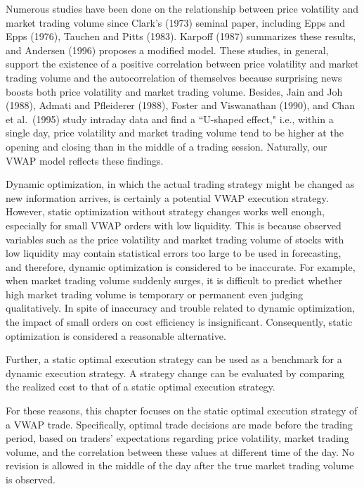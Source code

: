 Numerous studies have been done on the relationship between price volatility and market trading volume since Clark's (1973) seminal paper, including Epps and Epps (1976), Tauchen and Pitts (1983).  Karpoff (1987) summarizes these results, and Andersen (1996) proposes a modified model.  These studies, in general, support the existence of a positive correlation between price volatility and market trading volume and the autocorrelation of themselves because surprising news boosts both price volatility and market trading volume.  Besides, Jain and Joh (1988), Admati and Pfleiderer (1988), Foster and Viswanathan (1990), and Chan et al.~(1995) study intraday data and find a ``U-shaped effect," i.e., within a single day, price volatility and market trading volume tend to be higher at the opening and closing than in the middle of a trading session.  Naturally, our VWAP model reflects these findings.

Dynamic optimization, in which the actual trading strategy might be changed as new information arrives, is certainly a potential VWAP execution strategy.  However, static optimization without strategy changes works well enough, especially for small VWAP orders with low liquidity.  This is because observed variables such as the price volatility and market trading volume of stocks with low liquidity may contain statistical errors too large to be used in forecasting, and therefore, dynamic optimization is considered to be inaccurate.  For example, when market trading volume suddenly surges, it is difficult to predict whether high market trading volume is temporary or permanent even judging qualitatively.  In spite of inaccuracy and trouble related to dynamic optimization, the impact of small orders on cost efficiency is insignificant.  Consequently, static optimization is considered a reasonable alternative. 

Further, a static optimal execution strategy can be used as a benchmark for a dynamic execution strategy.  A strategy change can be evaluated by comparing the realized cost to that of a static optimal execution strategy.

For these reasons, this chapter focuses on the static optimal execution strategy of a VWAP trade.  Specifically, optimal trade decisions are made before the trading period, based on traders' expectations regarding price volatility, market trading volume, and the correlation between these values at different time of the day.  No revision is allowed in the middle of the day after the true market trading volume is observed.  

